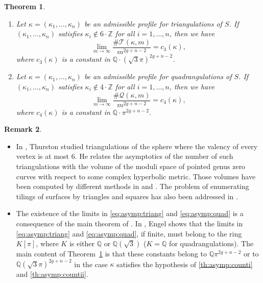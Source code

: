 \documentclass[10pt]{amsart}
\newenvironment{enumeratei}
{\bgroup\def\theenumi{\roman{enumi}}\def\theenumii{\arabic{enumii}}\begin{enumerate}}
{\end{enumerate}\egroup}
\theoremstyle{plain}
\newtheorem{Theorem}{Theorem}[section]
\theoremstyle{definition}
\newtheorem{Remark}[Theorem]{Remark}
\newcommand\Z{\mathbb{Z}}
\newcommand{\Q}{\mathbb{Q}}
\newcommand{\QQ}{\mathscr{Q}}
\newcommand{\TT}{\mathscr{T}}
\providecommand{\skpt}{\par\smallskip\noindent}
\begin{document}
\begin{Theorem}\label{th:asymp:count}
\begin{enumeratei}
\item\label{th:asymp:counti}
Let $\kappa=(\kappa_1,\dots,\kappa_n)$ be an admissible profile for triangulations of $S$. If $(\kappa_1,\dots,\kappa_n)$ satisfies $\kappa_i\not\in 6\cdot\Z$ for all $i=1,\dots,n$, then we have
\begin{equation}\label{eq:asymp:triang}
\lim_{m \to \infty} \frac{\#\TT(\kappa,m)}{m^{2g+n-2}}=c_3(\kappa),
\end{equation}
where $c_3(\kappa)$ is a constant in $\Q\cdot(\sqrt{3}\pi)^{2g+n-2}$.

\item\label{th:asymp:countii}
Let $\kappa=(\kappa_1,\dots,\kappa_n)$ be an admissible profile for quadrangulations of $S$. If $(\kappa_1,\dots,\kappa_n)$ satisfies $\kappa_i\not\in 4\cdot\Z$ for all $i=1,\dots,n$, then we have
\begin{equation}\label{eq:asymp:quad}
\lim_{m \to \infty} \frac{\#\QQ(\kappa,m)}{m^{2g+n-2}}=c_4(\kappa),
\end{equation}
where $c_4(\kappa)$ is a constant in $\Q\cdot\pi^{2g+n-2}$.
\end{enumeratei}
\end{Theorem}


\skpt
\begin{Remark}\label{rk:limit:known}
\begin{itemize}
\item
In \cite{Thurston98}, Thurston studied triangulations of the sphere where the valency of every vertex is at most $6$.
He relates the asymptotics of the number of such triangulations with the volume of the moduli space of pointed genus zero curves with respect to some complex hyperbolic metric. Those volumes have been computed by different methods in \cite{McMullen17} and \cite{KN18}.
The problem of enumerating tilings of surfaces by triangles and squares has also been addressed in \cite{ES18,Engel-I,Engel-II}.

\item The existence of the limits in \eqref{eq:asymp:triang} and \eqref{eq:asymp:quad} is a consequence of the main theorem of \cite{Ngu19}. In \cite{Engel-I}, Engel shows that the limits in \eqref{eq:asymp:triang} and \eqref{eq:asymp:quad}, if finite, must belong to the ring $K[\pi]$, where $K$ is either $\Q$ or $\Q(\sqrt{3})$ ($K=\Q$ for quadrangulations). The main content of Theorem~\ref{th:asymp:count} is that these constants belong to $\Q\pi^{2g+n-2}$ or to $\Q(\sqrt{3}\pi)^{2g+n-2}$ in the case $\kappa$ satisfies the hypothesis of \eqref{th:asymp:counti} and \eqref{th:asymp:countii}.
\end{itemize}
\end{Remark}
\end{document}

